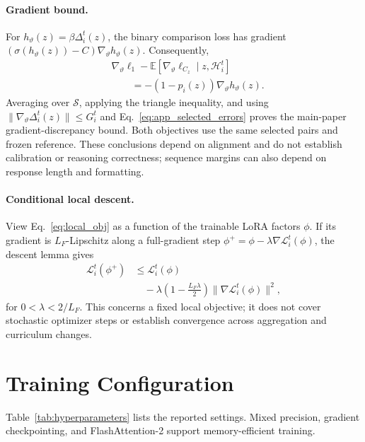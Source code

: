 \paragraph{Gradient bound.}
For $h_{\vartheta}(z)=\beta\Delta_i^t(z)$, the binary
comparison loss has gradient
$(\sigma(h_{\vartheta}(z))-C)\nabla_{\vartheta}h_{\vartheta}(z)$.
Consequently,
\begin{equation}
\begin{aligned}
&\nabla_{\vartheta}\ell_1
-\mathbb{E}[\nabla_{\vartheta}\ell_{C_z}\mid z,\mathcal{H}_i^t]\\
&\qquad=-(1-p_i(z))\nabla_{\vartheta}h_{\vartheta}(z).
\end{aligned}
\end{equation}
Averaging over $\mathcal{S}$, applying the triangle inequality,
and using $\|\nabla_{\vartheta}\Delta_i^t(z)\|\leq G_i^t$
and Eq.~\eqref{eq:app_selected_errors} proves the main-paper
gradient-discrepancy bound. Both objectives use the same selected
pairs and frozen reference. These conclusions depend on alignment
and do not establish calibration or reasoning correctness;
sequence margins can also depend on response length and formatting.

\paragraph{Conditional local descent.}
View Eq.~\eqref{eq:local_obj} as a function of the trainable
LoRA factors $\phi$. If its gradient is $L_F$-Lipschitz along
a full-gradient step $\phi^+=\phi-\lambda\nabla\mathcal{L}_i^t(\phi)$,
the descent lemma gives
\begin{equation}
\begin{aligned}
\mathcal{L}_i^t(\phi^+)
&\leq\mathcal{L}_i^t(\phi)\\
&\quad-\lambda\left(1-\frac{L_F\lambda}{2}\right)
\|\nabla\mathcal{L}_i^t(\phi)\|^2,
\end{aligned}
\end{equation}
for $0<\lambda<2/L_F$. This concerns a fixed local objective;
it does not cover stochastic optimizer steps or establish
convergence across aggregation and curriculum changes.

\section{Training Configuration}
\label{app:hyperparameters}
Table~\ref{tab:hyperparameters} lists the reported settings.
Mixed precision, gradient checkpointing, and FlashAttention-2
support memory-efficient training.


